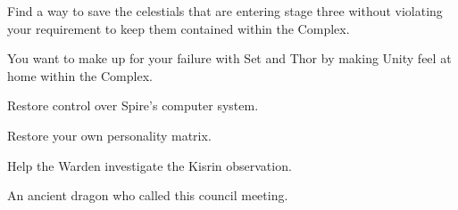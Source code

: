 \documentclass[char]{guardians}
\begin{document}
\begin{itemz}
  \item Find a way to save the celestials that are entering stage three without violating your requirement to keep them contained within the Complex.
  \item You want to make up for your failure with Set and Thor by making Unity feel at home within the Complex.
  \item Restore control over Spire's computer system.
  \item Restore your own personality matrix.
  \item Help the Warden investigate the Kisrin observation.
\end{itemz}


\begin{contacts}
  \contact{\cCaretaker{}} An ancient dragon who called this council meeting.
\end{contacts}
\end{document}
